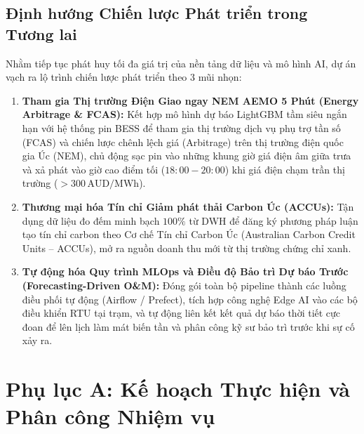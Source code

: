 \documentclass[12pt, a4paper]{report}
\begin{document}
\section{Định hướng Chiến lược Phát triển trong Tương lai}
\label{sec:strategic_roadmap}

Nhằm tiếp tục phát huy tối đa giá trị của nền tảng dữ liệu và mô hình AI, dự án vạch ra lộ trình chiến lược phát triển theo 3 mũi nhọn:

\begin{enumerate}[label=\arabic*., leftmargin=*]
    \item \textbf{Tham gia Thị trường Điện Giao ngay NEM AEMO 5 Phút (Energy Arbitrage \& FCAS):} 
    Kết hợp mô hình dự báo LightGBM tầm siêu ngắn hạn với hệ thống pin BESS để tham gia thị trường dịch vụ phụ trợ tần số (FCAS) và chiến lược chênh lệch giá (Arbitrage) trên thị trường điện quốc gia Úc (NEM), chủ động sạc pin vào những khung giờ giá điện âm giữa trưa và xả phát vào giờ cao điểm tối ($18:00 - 20:00$) khi giá điện chạm trần thị trường ($> 300\,\text{AUD/MWh}$).

    \item \textbf{Thương mại hóa Tín chỉ Giảm phát thải Carbon Úc (ACCUs):} 
    Tận dụng dữ liệu đo đếm minh bạch $100\%$ từ DWH để đăng ký phương pháp luận tạo tín chỉ carbon theo Cơ chế Tín chỉ Carbon Úc (Australian Carbon Credit Units -- ACCUs), mở ra nguồn doanh thu mới từ thị trường chứng chỉ xanh.

    \item \textbf{Tự động hóa Quy trình MLOps và Điều độ Bảo trì Dự báo Trước (Forecasting-Driven O\&M):} 
    Đóng gói toàn bộ pipeline thành các luồng điều phối tự động (Airflow / Prefect), tích hợp công nghệ Edge AI vào các bộ điều khiển RTU tại trạm, và tự động liên kết kết quả dự báo thời tiết cực đoan để lên lịch làm mát biến tần và phân công kỹ sư bảo trì trước khi sự cố xảy ra.
\end{enumerate}
\chapter*{Phụ lục A: Kế hoạch Thực hiện và Phân công Nhiệm vụ}
\label{app:kehoach}
\renewcommand{\thetable}{A.\arabic{table}}
\setcounter{table}{0}
\renewcommand{\thefigure}{A.\arabic{figure}}
\setcounter{figure}{0}
\end{document}
